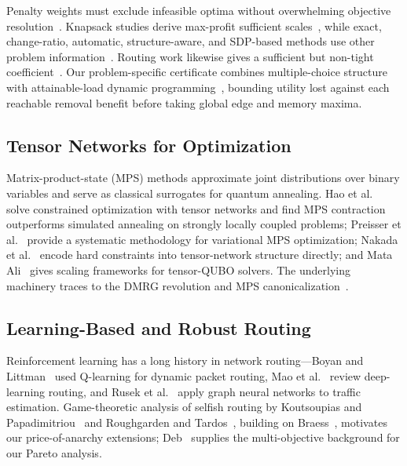 \documentclass[twocolumn]{article}
\begin{document}
Penalty weights must exclude infeasible optima without overwhelming
objective resolution~\cite{verma2022penalty,alessandroni2025bigm}.
Knapsack studies derive max-profit sufficient
scales~\cite{quintero2021knapsack,guney2025multiknapsack}, while
exact, change-ratio, automatic, structure-aware, and SDP-based methods
use other problem information~\cite{garcia2022exact,
ayodele2022penalty,liu2025multiple,liu2026structure,
alessandroni2025bigm}.  Routing work likewise gives a sufficient but
non-tight coefficient~\cite{seker2024routing}.  Our problem-specific
certificate combines multiple-choice structure~\cite{sinha1979multiple}
with attainable-load dynamic programming~\cite{trick2003dynamic},
bounding utility lost against each reachable removal benefit before
taking global edge and memory maxima.

\subsection{Tensor Networks for Optimization}
\label{sec:related-tn}

Matrix-product-state (MPS) methods approximate joint distributions
over binary variables and serve as classical surrogates for quantum
annealing.  Hao et al.~\cite{hao2022quantum} solve constrained
optimization with tensor networks and find MPS contraction outperforms
simulated annealing on strongly locally coupled problems;
Preisser et al.~\cite{preisser2026variational} provide a systematic
methodology for variational MPS optimization; Nakada et
al.~\cite{nakada2025quick} encode hard constraints into tensor-network
structure directly; and Mata Ali~\cite{mata2025explicit,
mata2023polynomial} gives scaling frameworks for tensor-QUBO solvers.
The underlying machinery traces to the DMRG revolution and MPS
canonicalization~\cite{white1992dmrg,schollwock2011dmrg,
vidal2003efficient,orus2014practical,orus2019tensor}.

\subsection{Learning-Based and Robust Routing}
\label{sec:related-learning}

Reinforcement learning has a long history in network routing---Boyan
and Littman~\cite{boyan1993packet} used Q-learning for dynamic packet
routing, Mao et al.~\cite{mao2017routing} review deep-learning routing,
and Rusek et al.~\cite{rusek2020routenets} apply graph neural networks
to traffic estimation.  Game-theoretic analysis of selfish routing by
Koutsoupias and Papadimitriou~\cite{koutsoupias1999worst} and
Roughgarden and Tardos~\cite{roughgarden2002bad}, building on
Braess~\cite{braess1968paradoxon}, motivates our price-of-anarchy
extensions; Deb~\cite{deb2001multiobjective} supplies the
multi-objective background for our Pareto analysis.
\end{document}
